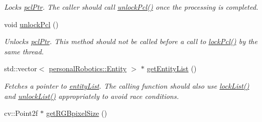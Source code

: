 \begin{DoxyCompactItemize}
\begin{DoxyCompactList}\small\item\em Locks \hyperlink{classpersonal_robotics_1_1_object_segmentor_afd8a8a0d82a7116b78142f4ef3fa3c49}{pcl\+Ptr}. The caller should call \hyperlink{classpersonal_robotics_1_1_object_segmentor_a534a14468aaeb1d3264286b0e070d865}{unlock\+Pcl()} once the processing is completed. \end{DoxyCompactList}\item 
\hypertarget{classpersonal_robotics_1_1_object_segmentor_a534a14468aaeb1d3264286b0e070d865}{}void \hyperlink{classpersonal_robotics_1_1_object_segmentor_a534a14468aaeb1d3264286b0e070d865}{unlock\+Pcl} ()\label{classpersonal_robotics_1_1_object_segmentor_a534a14468aaeb1d3264286b0e070d865}

\begin{DoxyCompactList}\small\item\em Unlocks \hyperlink{classpersonal_robotics_1_1_object_segmentor_afd8a8a0d82a7116b78142f4ef3fa3c49}{pcl\+Ptr}. This method should not be called before a call to \hyperlink{classpersonal_robotics_1_1_object_segmentor_ad5b256a48208fbbb84f8e06b14f5e1c4}{lock\+Pcl()} by the same thread. \end{DoxyCompactList}\item 
\hypertarget{classpersonal_robotics_1_1_object_segmentor_a688bd8c15d467f7ed1c5e25b09524a40}{}std\+::vector$<$ \hyperlink{classpersonal_robotics_1_1_entity}{personal\+Robotics\+::\+Entity} $>$ $\ast$ \hyperlink{classpersonal_robotics_1_1_object_segmentor_a688bd8c15d467f7ed1c5e25b09524a40}{get\+Entity\+List} ()\label{classpersonal_robotics_1_1_object_segmentor_a688bd8c15d467f7ed1c5e25b09524a40}

\begin{DoxyCompactList}\small\item\em Fetches a pointer to \hyperlink{classpersonal_robotics_1_1_object_segmentor_aab2136d73a02806e2b09611ed67e65d9}{entity\+List}. The calling function should also use \hyperlink{classpersonal_robotics_1_1_object_segmentor_a970e0509a3d2d02ca856e707e3c9d767}{lock\+List()} and \hyperlink{classpersonal_robotics_1_1_object_segmentor_a935000c5a4446dc90c768e4fa0c104b9}{unlock\+List()} appropriately to avoid race conditions. \end{DoxyCompactList}\item 
\hypertarget{classpersonal_robotics_1_1_object_segmentor_ac43076bc6a89431f97e847bd38bce43f}{}cv\+::\+Point2f $\ast$ \hyperlink{classpersonal_robotics_1_1_object_segmentor_ac43076bc6a89431f97e847bd38bce43f}{get\+R\+G\+Bpixel\+Size} ()\label{classpersonal_robotics_1_1_object_segmentor_ac43076bc6a89431f97e847bd38bce43f}


\end{DoxyCompactItemize}

